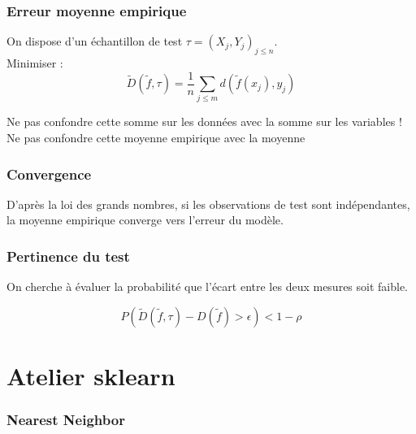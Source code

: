\documentclass[11pt]{beamer}
\newenvironment{slide}[1]{%
\begin{frame}[environment=slide]
\frametitle{#1}
}{%
\end{frame}
}
\newcommand{\Python}[1]{
	{\small	}
}
\begin{document}
\begin{slide}{Erreur moyenne empirique}

On dispose d'un échantillon de test $\tau = (X_j,Y_j)_{j\leq n}$.\\

Minimiser :
$$\tilde{D}(\tilde{f},\tau) = \frac{1}{n}\sum_{j \leq m} d(\tilde{f}(x_j),y_j)$$

\pause

Ne pas confondre cette somme sur les données avec la somme sur les variables !\\
Ne pas confondre cette moyenne empirique avec la moyenne 
\end{slide}

\begin{slide}{Convergence}

D'après la loi des grands nombres, si les observations de test sont indépendantes, la moyenne empirique converge vers l'erreur du modèle.
\end{slide}

\begin{slide}{Pertinence du test}
On cherche à évaluer la probabilité que l'écart entre les deux mesures soit faible.

$$P\left(\tilde{D}(\tilde{f},\tau)-D(\tilde{f}) > \epsilon \right) < 1 - \rho$$

\end{slide}

\section{Atelier sklearn}

\begin{slide}{Nearest Neighbor}

\Python{sklearn1-nn}

\end{slide}
\end{document}
